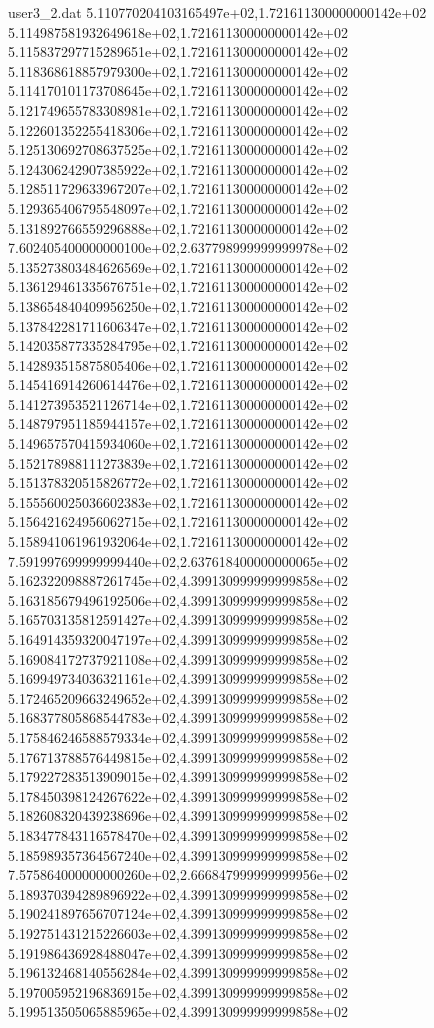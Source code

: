 \begin{filecontents}{user3_2.dat}
5.110770204103165497e+02,1.721611300000000142e+02
5.114987581932649618e+02,1.721611300000000142e+02
5.115837297715289651e+02,1.721611300000000142e+02
5.118368618857979300e+02,1.721611300000000142e+02
5.114170101173708645e+02,1.721611300000000142e+02
5.121749655783308981e+02,1.721611300000000142e+02
5.122601352255418306e+02,1.721611300000000142e+02
5.125130692708637525e+02,1.721611300000000142e+02
5.124306242907385922e+02,1.721611300000000142e+02
5.128511729633967207e+02,1.721611300000000142e+02
5.129365406795548097e+02,1.721611300000000142e+02
5.131892766559296888e+02,1.721611300000000142e+02
7.602405400000000100e+02,2.637798999999999978e+02
5.135273803484626569e+02,1.721611300000000142e+02
5.136129461335676751e+02,1.721611300000000142e+02
5.138654840409956250e+02,1.721611300000000142e+02
5.137842281711606347e+02,1.721611300000000142e+02
5.142035877335284795e+02,1.721611300000000142e+02
5.142893515875805406e+02,1.721611300000000142e+02
5.145416914260614476e+02,1.721611300000000142e+02
5.141273953521126714e+02,1.721611300000000142e+02
5.148797951185944157e+02,1.721611300000000142e+02
5.149657570415934060e+02,1.721611300000000142e+02
5.152178988111273839e+02,1.721611300000000142e+02
5.151378320515826772e+02,1.721611300000000142e+02
5.155560025036602383e+02,1.721611300000000142e+02
5.156421624956062715e+02,1.721611300000000142e+02
5.158941061961932064e+02,1.721611300000000142e+02
7.591997699999999440e+02,2.637618400000000065e+02
5.162322098887261745e+02,4.399130999999999858e+02
5.163185679496192506e+02,4.399130999999999858e+02
5.165703135812591427e+02,4.399130999999999858e+02
5.164914359320047197e+02,4.399130999999999858e+02
5.169084172737921108e+02,4.399130999999999858e+02
5.169949734036321161e+02,4.399130999999999858e+02
5.172465209663249652e+02,4.399130999999999858e+02
5.168377805868544783e+02,4.399130999999999858e+02
5.175846246588579334e+02,4.399130999999999858e+02
5.176713788576449815e+02,4.399130999999999858e+02
5.179227283513909015e+02,4.399130999999999858e+02
5.178450398124267622e+02,4.399130999999999858e+02
5.182608320439238696e+02,4.399130999999999858e+02
5.183477843116578470e+02,4.399130999999999858e+02
5.185989357364567240e+02,4.399130999999999858e+02
7.575864000000000260e+02,2.666847999999999956e+02
5.189370394289896922e+02,4.399130999999999858e+02
5.190241897656707124e+02,4.399130999999999858e+02
5.192751431215226603e+02,4.399130999999999858e+02
5.191986436928488047e+02,4.399130999999999858e+02
5.196132468140556284e+02,4.399130999999999858e+02
5.197005952196836915e+02,4.399130999999999858e+02
5.199513505065885965e+02,4.399130999999999858e+02

\end{filecontents}
